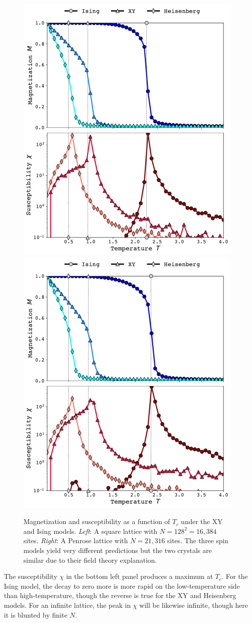 \documentclass[
  amsmath,
  amssymb,
  aps,
  twocolumn,
  nofootinbib,
  nolongbibliography,
  floatfix,
]{revtex4-2}
\begin{document}
\begin{figure}
  \centering
  \includegraphics[width=0.49\linewidth]{../figs/square.pdf}\hfill
  \includegraphics[width=0.49\linewidth]{../figs/penrose.pdf}
  \caption{Magnetization and susceptibility as a function of $T_c$ under the XY and Ising models. \textit{Left}: A square lattice with $N=128^2=16,384$ sites. \textit{Right}: A Penrose lattice with $N=21,316$ sites. The three spin models yield very different predictions but the two crystals are similar due to their field theory explanation.}
  \label{fig:square}
\end{figure}

The susceptibility $\chi$ in the bottom left panel produces a maximum at $T_c$. For the Ising model, the decay to zero more is more rapid on the low-temperature side than high-temperature, though the reverse is true for the XY and Heisenberg models. For an infinite lattice, the peak in $\chi$ will be likewise infinite, though here it is blunted by finite $N$.
\end{document}
